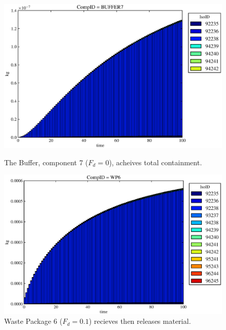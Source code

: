 \begin{figure}[ht]
\begin{minipage}[b]{0.45\linewidth}
  \includegraphics[width=\textwidth]{./chapters/demonstration/base/lpDMII3.eps}
  \caption[Case LPDMII Buffer Contaminants]{
    The Buffer, component 7 ($F_d=0$), acheives total containment.
    }
  \label{fig:lpDMIIbuff}

\end{minipage}
\hspace{0.05\linewidth}
\begin{minipage}[b]{0.45\linewidth}
  \includegraphics[width=\textwidth]{./chapters/demonstration/base/lpDMII2.eps}
  \caption[Case LPDMII Waste Package Contaminants.]{ 
    Waste Package 6 ($F_d = 0.1$) recieves then releases material. 
    }
  \label{fig:lpDMIIwp6}


\end{minipage}
\end{figure}
